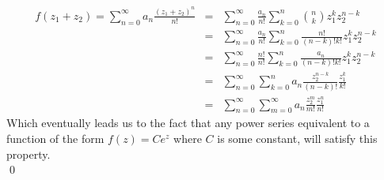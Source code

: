 \documentclass[10pt]{amsart}
\theoremstyle{nonumberplain}
\begin{document}
\begin{enumerate}[label={\bf {\arabic*}:}]
\begin{eqnarray*}
f(z_1 + z_2) = \sum_{n=0}^\infty a_n\frac{(z_1 + z_2)^n}{n!} &=& \sum_{n=0}^{\infty} \frac{a_n}{n!} \sum_{k=0}^{n} {n \choose k}z_1^k z_2^{n-k} \\
											   &=& \sum_{n=0}^{\infty} \frac{a_n}{n!} \sum_{k=0}^{n} \frac{n!}{(n-k)! k!}z_1^k z_2^{n-k} \\
											   &=& \sum_{n=0}^{\infty} \frac{n!}{n!} \sum_{k=0}^{n} \frac{a_n}{(n-k)! k!}z_1^k z_2^{n-k} \\
											   &=& \sum_{n=0}^{\infty} \sum_{k=0}^{n} a_n\frac{z_2^{n-k}}{(n-k)!}\frac{z_1^k}{ k!} \\
											   &=& \sum_{n=0}^{\infty} \sum_{m=0}^{\infty} a_n\frac{z_2^m}{m!}\frac{z_1^n}{ n!}
\end{eqnarray*}
Which eventually leads us to the fact that any power series equivalent to a function of the form $f(z) = Ce^z$ where $C$ is some constant, will satisfy this property. \\
\qed
  

\end{enumerate}
\end{document}
